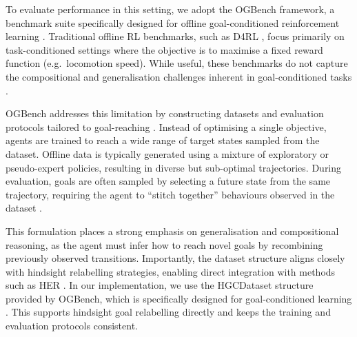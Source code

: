 To evaluate performance in this setting, we adopt the OGBench framework, a benchmark suite specifically designed for offline goal-conditioned reinforcement learning \cite{ogbench_park2025}. Traditional offline RL benchmarks, such as D4RL \cite{fu2021d4rldatasetsdeepdatadriven}, focus primarily on task-conditioned settings where the objective is to maximise a fixed reward function (e.g.\ locomotion speed). While useful, these benchmarks do not capture the compositional and generalisation challenges inherent in goal-conditioned tasks \cite{her, ogbench_park2025}.

OGBench addresses this limitation by constructing datasets and evaluation protocols tailored to goal-reaching \cite{ogbench_park2025}. Instead of optimising a single objective, agents are trained to reach a wide range of target states sampled from the dataset. Offline data is typically generated using a mixture of exploratory or pseudo-expert policies, resulting in diverse but sub-optimal trajectories. During evaluation, goals are often sampled by selecting a future state from the same trajectory, requiring the agent to ``stitch together'' behaviours observed in the dataset \cite{fu2021d4rldatasetsdeepdatadriven, ogbench_park2025}.

This formulation places a strong emphasis on generalisation and compositional reasoning, as the agent must infer how to reach novel goals by recombining previously observed transitions. Importantly, the dataset structure aligns closely with hindsight relabelling strategies, enabling direct integration with methods such as HER \cite{her}.
In our implementation, we use the HGCDataset structure provided by OGBench, which is specifically designed for goal-conditioned learning \cite{ogbench_park2025}. This supports hindsight goal relabelling directly and keeps the training and evaluation protocols consistent.



